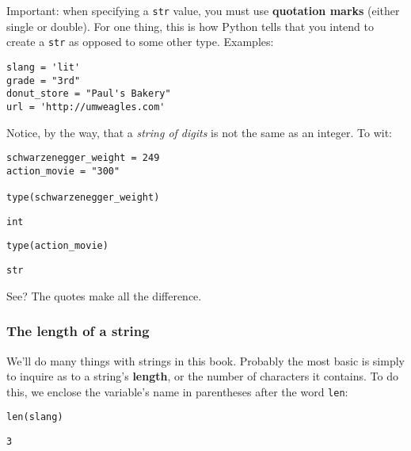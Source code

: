 Important: when specifying a \texttt{str} value, you must use \textbf{quotation
marks} (either single or double). For one thing, this is how Python tells that
you intend to create a \texttt{str} as opposed to some other type. Examples:

\begin{Verbatim}[fontsize=\small,samepage=true,frame=single,framesep=3mm]
slang = 'lit'
grade = "3rd"
donut_store = "Paul's Bakery"
url = 'http://umweagles.com'
\end{Verbatim}

Notice, by the way, that a \textit{string of digits} is not the same as an
integer. To wit:

\begin{Verbatim}[fontsize=\small,samepage=true,frame=single,framesep=3mm]
schwarzenegger_weight = 249
action_movie = "300"

type(schwarzenegger_weight)
\end{Verbatim}
\begin{Verbatim}[fontsize=\small,samepage=true,frame=leftline,framesep=5mm,framerule=1mm]
int
\end{Verbatim}

\begin{Verbatim}[fontsize=\small,samepage=true,frame=single,framesep=3mm]
type(action_movie)
\end{Verbatim}
\begin{Verbatim}[fontsize=\small,samepage=true,frame=leftline,framesep=5mm,framerule=1mm]
str
\end{Verbatim}

See? The quotes make all the difference.

\subsubsection{The length of a string}

We'll do many things with strings in this book. Probably the most basic is
simply to inquire as to a string's \textbf{length}, or the number of characters
it contains. To do this, we enclose the variable's name in parentheses after
the word \texttt{len}:

\begin{Verbatim}[fontsize=\small,samepage=true,frame=single,framesep=3mm]
len(slang)
\end{Verbatim}
\begin{Verbatim}[fontsize=\small,samepage=true,frame=leftline,framesep=5mm,framerule=1mm]
3
\end{Verbatim}

